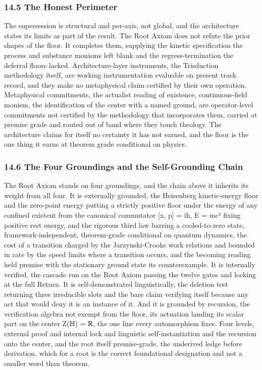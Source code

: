 \documentclass[10pt,twocolumn]{article}
\begin{document}
\hypertarget{the-honest-perimeter}{%
\subsubsection{14.5 The Honest Perimeter}\label{the-honest-perimeter}}

The supersession is structural and per-axis, not global, and the
architecture states its limits as part of the result. The Root Axiom
does not refute the prior shapes of the floor. It completes them,
supplying the kinetic specification the process and substance monisms
left blank and the regress-termination the deferral floors lacked.
Architecture-layer instruments, the Trisduction methodology itself, are
working instrumentation evaluable on present track record, and they make
no metaphysical claim certified by their own operation. Metaphysical
commitments, the actualist reading of existence, continuous-field
monism, the identification of the center with a named ground, are
operator-level commitments not certified by the methodology that
incorporates them, carried at premise grade and routed out of band where
they touch theology. The architecture claims for itself no certainty it
has not earned, and the floor is the one thing it earns at theorem grade
conditional on physics.

\hypertarget{the-four-groundings-and-the-self-grounding-chain}{%
\subsubsection{14.6 The Four Groundings and the Self-Grounding
Chain}\label{the-four-groundings-and-the-self-grounding-chain}}

The Root Axiom stands on four groundings, and the chain above it
inherits its weight from all four. It is externally grounded, the
Heisenberg kinetic-energy floor and the zero-point energy putting a
strictly positive floor under the energy of any confined existent from
the canonical commutator {[}x, p{]} = iħ, E = mc² fixing positive rest
energy, and the rigorous third law barring a cooled-to-zero state,
framework-independent, theorem-grade conditional on quantum dynamics,
the cost of a transition charged by the Jarzynski-Crooks work relations
and bounded in rate by the speed limits where a transition occurs, and
the becoming reading held premise with the stationary ground state its
counterexample. It is internally verified, the cascade run on the Root
Axiom passing the twelve gates and locking at the full Return. It is
self-demonstrated linguistically, the deletion test returning three
irreducible slots and the bare claim verifying itself because any act
that would deny it is an instance of it. And it is grounded by
recursion, the verification algebra not exempt from the floor, its
actuation landing its scalar part on the center Z(ℍ) = ℝ, the one line
every automorphism fixes. Four levels, external proof and internal lock
and linguistic self-instantiation and the recursion onto the center, and
the root itself premise-grade, the underived ledge before derivation,
which for a root is the correct foundational designation and not a
smaller word than theorem.
\end{document}
